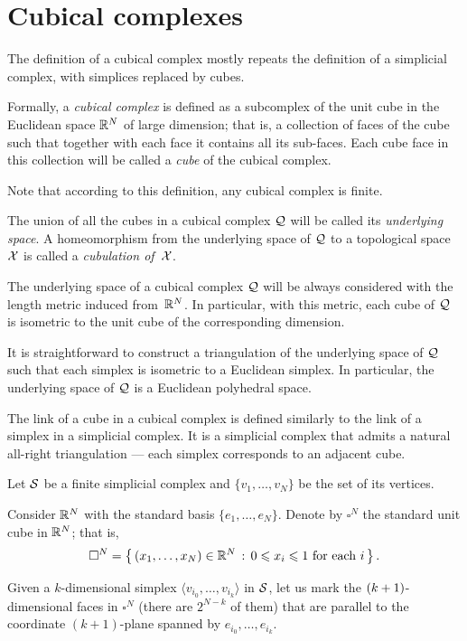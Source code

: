 \section{Cubical complexes}

The definition of a cubical complex
mostly repeats the definition of a simplicial complex, 
with simplices replaced by cubes.

Formally, a \emph{cubical complex} is defined as a subcomplex 
of the unit cube in the Euclidean space $\mathbb{R}^N$ of large dimension;
that is, a collection of faces of the cube
such that together with each face it contains all its sub-faces.
Each cube face in this collection 
will be called a \emph{cube} of the cubical complex.

Note that according to this definition, 
any cubical complex is finite.

The union of all the cubes in a cubical complex $\mathcal{Q}$ will be called its \emph{underlying space}.
A homeomorphism from the underlying space of $\mathcal{Q}$ to a topological space $\mathcal{X}$ is called a \emph{cubulation of}~$\mathcal{X}$.

The underlying space of a cubical complex $\mathcal{Q}$ will be always considered with the length metric
induced from~$\mathbb{R}^N$.
In particular, with this metric, 
each cube of $\mathcal{Q}$ is isometric to the unit cube of the corresponding dimension.

It is straightforward to construct a triangulation 
of the underlying space of $\mathcal{Q}$ 
such that each simplex is isometric to a Euclidean simplex.
In particular, the underlying space of $\mathcal{Q}$ is a Euclidean polyhedral space.

The link of a cube in a cubical complex is defined similarly to the link of a simplex in a simplicial complex.
It is a simplicial complex that admits a natural all-right triangulation --- each simplex corresponds to an adjacent cube.

Let $\mathcal{S}$ be a finite simplicial complex and $\{v_1,\ldots,v_N\}$ be the set of its vertices.

Consider $\mathbb{R}^N$ with the standard basis $\{e_1,\ldots,e_N\}$.
Denote by $\square^N$ the standard unit cube in $\mathbb{R}^N$;
that is, 
\[\square^N=\left\{\,{(x_1,\ldots,x_N)\in \mathbb{R}^N}\,:\,{0\leqslant x_i\leqslant 1\ \text{for each}\ i}\,\right\}.\]

Given a $k$-dimensional simplex $\langle v_{i_0},\ldots,v_{i_k}\rangle$ in $\mathcal{S}$, let us mark the $(k\z+1)$-dimensional faces in $\square^N$ (there are $2^{N-k}$ of them) that are parallel to the coordinate $(k+1)$-plane spanned by $e_{i_0},\ldots,e_{i_k}$.

